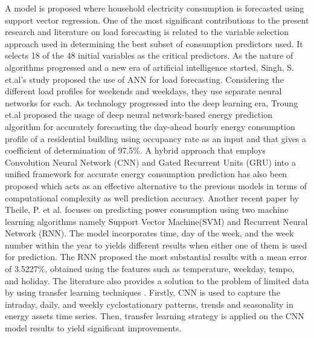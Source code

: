 \documentclass[conference]{IEEEtran}
\begin{document}
A model is proposed \cite{bot_ruano_ruano_2020} where household electricity consumption is forecasted using support vector regression. One of the most significant contributions to the present research and literature on load forecasting is related to the variable selection approach used in determining the best subset of consumption predictors used. It selects 18 of the 48 initial variables as the critical predictors. As the nature of algorithms progressed and a new era of artificial intelligence started, Singh, S. et.al's study \cite{singh_hussain_bazaz_2017} proposed the use of ANN for load forecasting. Considering the different load profiles for weekends and weekdays, they use separate neural networks for each. As technology progressed into the deep learning era, Troung et.al \cite{app11052229} proposed the usage of deep neural network-based energy prediction algorithm for accurately forecasting the day-ahead hourly energy consumption profile of a residential building using occupancy rate as an input and that gives a coefficient of determination of 97.5\%. A hybrid approach that employs Convolution Neural Network (CNN) and Gated Recurrent Units (GRU) into a unified framework for accurate energy consumption prediction has also been proposed \cite{articleSajjad} which acts as an effective alternative to the previous models in terms of computational complexity as well prediction accuracy. Another recent paper by Theile, P. et al. \cite{Theile2018DayaheadEC} focuses on predicting power consumption using two machine learning algorithms namely Support Vector Machine(SVM) and Recurrent Neural Network (RNN). The model incorporates time, day of the week, and the week number within the year to yields different results when either one of them is used for prediction. The RNN proposed the most substantial results with a mean error of 3.5227\%, obtained using the features such as temperature, weekday, tempo, and holiday. The literature also provides a solution to the problem of limited data by using transfer learning techniques \cite{DBLP:journals/corr/abs-1906-02646}. Firstly, CNN is used to capture the intraday, daily, and weekly cyclostationary patterns, trends and seasonality in energy assets time series. Then, transfer learning strategy is applied on the CNN model results to yield significant improvements. 
\end{document}
